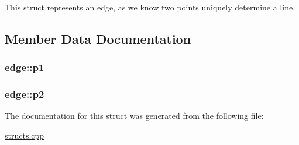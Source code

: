 This struct represents an edge, as we know two points uniquely determine a line. 

\subsection{Member Data Documentation}
\subsubsection[{\texorpdfstring{p1}{p1}}]{ edge\+::p1}\hypertarget{structedge_a7b074374ee3059d29a93e9e76480274e}{}\label{structedge_a7b074374ee3059d29a93e9e76480274e}
\subsubsection[{\texorpdfstring{p2}{p2}}]{ edge\+::p2}\hypertarget{structedge_a105ba74e7b01aba7e0e113ab286dc883}{}\label{structedge_a105ba74e7b01aba7e0e113ab286dc883}


The documentation for this struct was generated from the following file\+:\begin{DoxyCompactItemize}
\item 
\hyperlink{structs_8cpp}{structs.\+cpp}\end{DoxyCompactItemize}
